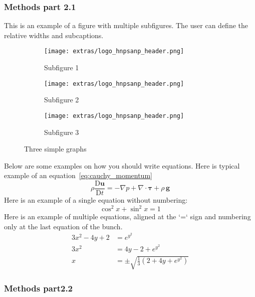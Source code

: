 \documentclass[
  manuscript=article,  %
  layout=publish,  %
  year=20XX,
  volume=XX,
]{extras/hnpsanp}
\begin{document}
\subsubsection{Methods part 2.1}
\blindtext
This is an example of a figure with multiple subfigures. The user can define the relative widths and subcaptions.
\begin{figure}
     \centering
     \begin{subfigure}[b]{0.3\textwidth}
         \centering
         \texttt{[image: extras/logo\_hnpsanp\_header.png]}
         \caption{Subfigure 1}
         \label{fig:subfig1}
     \end{subfigure}
     \hfill
     \begin{subfigure}[b]{0.3\textwidth}
         \centering
         \texttt{[image: extras/logo\_hnpsanp\_header.png]}
         \caption{Subfigure 2}
         \label{fig:subfig2}
     \end{subfigure}
     \hfill
     \begin{subfigure}[b]{0.3\textwidth}
         \centering
         \texttt{[image: extras/logo\_hnpsanp\_header.png]}
         \caption{Subfigure 3}
         \label{fig:subfig3}
     \end{subfigure}
        \caption{Three simple graphs}
        \label{fig:main_figure_label}
\end{figure}

Below are some examples on how you should write equations. Here is typical example of an equation~\eqref{eq:cauchy_momentum}
%
\begin{equation}
\rho\frac{\mathrm{D} \mathbf{u}}{\mathrm{D} t} = - \nabla p + \nabla \cdot \boldsymbol \tau + \rho\,\mathbf{g}
\label{eq:cauchy_momentum}
\end{equation}
%
Here is an example of a single equation without numbering:
\[
\cos^2x+\sin^2x=1
\label{eq:trigon}
\]
%
Here is an example of multiple equations, aligned at the `=` sign and numbering only at the last equation of the bunch.
%
\begin{align}
    3x^2-4y+2 &=e^{y^2} \nonumber\\
    3x^2 &=4y-2+e^{y^2}\nonumber\\
    x &=\pm\sqrt{\frac{1}{3}\left(2+4y+e^{y^2}\right)}
    \label{eq:multi}
\end{align}

\subsubsection{Methods part2.2}
\end{document}
